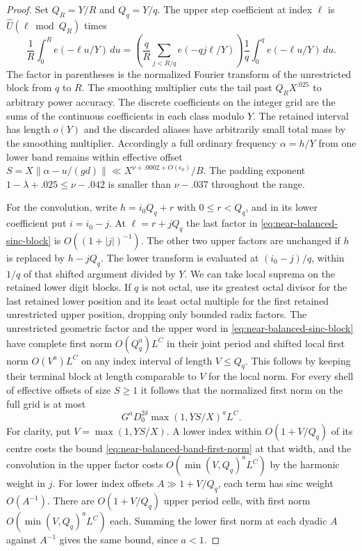 \documentclass[11pt,a4paper]{article}
\theoremstyle{paperplain}
\numberwithin{equation}{section}
\begin{document}
\begin{proof}
Set $Q_R=Y/R$ and $Q_q=Y/q$. The upper step coefficient at
index $\ell$ is $\widehat U(\ell\bmod Q_R)$ times
\begin{equation}\label{eq:near-balanced-sinc-block}
 \frac1R\int_0^R e(-\ell u/Y)\,du
   = \left(\frac{q}{R}\sum_{j<R/q}e(-qj\ell/Y)\right)
                    \frac1q\int_0^q e(-\ell u/Y)\,du.
\end{equation}
The factor in parentheses is the normalized Fourier
transform of the unrestricted block from $q$ to $R$.
The smoothing multiplier cuts the tail past $Q_R X^{.025}$
to arbitrary power accuracy. The discrete coefficients on the integer
grid are the sums of the continuous coefficients in each class modulo
$Y$. The retained interval has length $o(Y)$ and the discarded aliases
have arbitrarily small total mass by the smoothing multiplier. Accordingly a full ordinary
frequency $\alpha=h/Y$ from one lower band remains within
effective offset $S=X\|\alpha-u/(gd)\|\ll X^{\nu+.0002+O(\epsilon_0)}/B$.
The padding exponent $1-\lambda+.025\le\nu-.042$ is
smaller than $\nu-.037$ throughout the range.

For the convolution, write $h=i_0 Q_q+r$ with $0\le r<Q_q$,
and in its lower coefficient put $i=i_0-j$. At
$\ell=r+jQ_q$ the last factor in
\eqref{eq:near-balanced-sinc-block} is $O((1+|j|)^{-1})$.
The other two upper factors are unchanged if $h$ is replaced
by $h-jQ_q$. The lower transform is evaluated at $(i_0-j)/q$,
within $1/q$ of that shifted argument divided by $Y$.
We can take local suprema on the retained lower digit blocks.
If $q$ is not octal, use its greatest octal divisor for the
last retained lower position and its least octal multiple
for the first retained unrestricted upper position, dropping
only bounded radix factors. The unrestricted geometric
factor and the upper word in
\eqref{eq:near-balanced-sinc-block} have complete first norm
$O(Q_q^a)L^C$ in their joint period and shifted local first
norm $O(V^a)L^C$ on any index interval of length $V\le Q_q$.
This follows by keeping their terminal block at length
comparable to $V$ for the local norm. For every shell of
effective offsets of size $S\ge1$ it follows that the
normalized first norm on the full grid is at most
\begin{equation}\label{eq:near-balanced-lift-first-norm}
                  G^a D_0^{2\delta}\max(1,YS/X)^a L^C .
\end{equation}
For clarity, put $V=\max(1,YS/X)$. A lower index within
$O(1+V/Q_q)$ of its centre costs the bound
\eqref{eq:near-balanced-band-first-norm} at that width,
and the convolution in the upper factor costs
$O(\min(V,Q_q)^a L^C)$ by the harmonic weight in $j$.
For lower index offsets $A\gg1+V/Q_q$, each term has
sinc weight $O(A^{-1})$. There are $O(1+V/Q_q)$ upper
period cells, with first norm $O(\min(V,Q_q)^a L^C)$ each.
Summing the lower first norm at each dyadic $A$ against
$A^{-1}$ gives the same bound, since $a<1$.


\end{proof}
\end{document}
